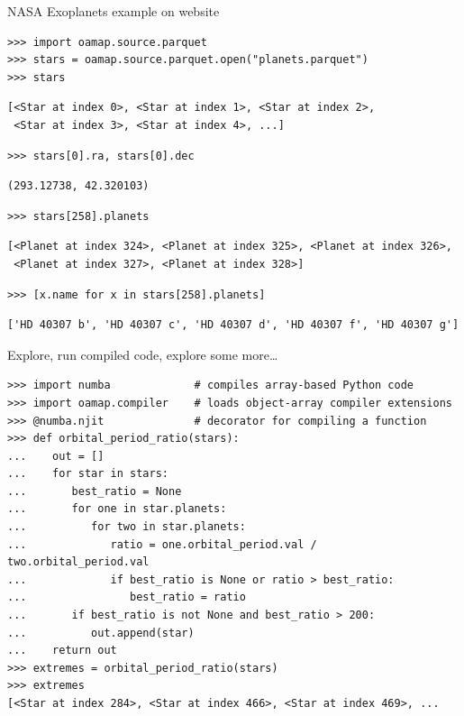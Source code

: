 \documentclass[aspectratio=169]{beamer}
\begin{document}
\begin{frame}[fragile]{NASA Exoplanets example on website}
\vspace{0.1 cm}
\small
\begin{verbatim}
>>> import oamap.source.parquet
>>> stars = oamap.source.parquet.open("planets.parquet")
>>> stars
\end{verbatim}
\begin{verbatim}
[<Star at index 0>, <Star at index 1>, <Star at index 2>,
 <Star at index 3>, <Star at index 4>, ...]
\end{verbatim}
\begin{verbatim}
>>> stars[0].ra, stars[0].dec
\end{verbatim}
\begin{verbatim}
(293.12738, 42.320103)
\end{verbatim}
\begin{verbatim}
>>> stars[258].planets
\end{verbatim}
\begin{verbatim}
[<Planet at index 324>, <Planet at index 325>, <Planet at index 326>,
 <Planet at index 327>, <Planet at index 328>]
\end{verbatim}
\begin{verbatim}
>>> [x.name for x in stars[258].planets]
\end{verbatim}
\begin{verbatim}
['HD 40307 b', 'HD 40307 c', 'HD 40307 d', 'HD 40307 f', 'HD 40307 g']
\end{verbatim}
\end{frame}

\begin{frame}[fragile]{Explore, run compiled code, explore some more\ldots}
\vspace{0.1 cm}
\small
\begin{verbatim}
>>> import numba             # compiles array-based Python code
>>> import oamap.compiler    # loads object-array compiler extensions
>>> @numba.njit              # decorator for compiling a function
>>> def orbital_period_ratio(stars):
...    out = []
...    for star in stars:
...       best_ratio = None
...       for one in star.planets:
...          for two in star.planets:
...             ratio = one.orbital_period.val / two.orbital_period.val
...             if best_ratio is None or ratio > best_ratio:
...                best_ratio = ratio
...       if best_ratio is not None and best_ratio > 200:
...          out.append(star)
...    return out
>>> extremes = orbital_period_ratio(stars)
>>> extremes
[<Star at index 284>, <Star at index 466>, <Star at index 469>, ...
\end{verbatim}
\end{frame}
\end{document}
